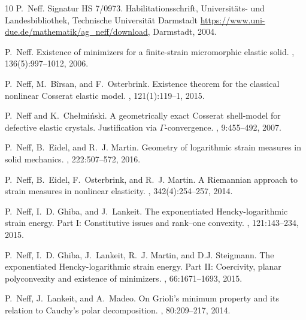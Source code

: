 \documentclass[11pt]{article}
\begin{document}
\begin{footnotesize}
\begin{thebibliography}{10}
P.~Neff.
\newblock Signatur HS 7/0973. Habilitationsschrift, Universit\"ats- und
  Landesbibliothek, Technische Universit\"at Darmstadt
  \url{https://www.uni-due.de/mathematik/ag_neff/download}, Darmstadt, 2004.

P.~Neff.
\newblock Existence of minimizers for a finite-strain micromorphic elastic
  solid.
, 136(5):997--1012, 2006.

P.~Neff, M.~B\^{i}rsan, and F.~Osterbrink.
\newblock Existence theorem for the classical nonlinear {C}osserat elastic
  model.
, 121(1):119--1, 2015.

P.~Neff and K.~Che{\l}mi\'nski.
\newblock A geometrically exact {C}osserat shell-model for defective elastic
  crystals. {J}ustification via {$\Gamma$}-convergence.
, 9:455--492, 2007.

P.~Neff, B.~Eidel, and R.~J. Martin.
\newblock Geometry of logarithmic strain measures in solid mechanics.
, 222:507--572,
  2016.

P.~Neff, B.~Eidel, F.~Osterbrink, and R.~J. Martin.
\newblock A {Riemannian} approach to strain measures in nonlinear elasticity.
, 342(4):254--257, 2014.

P.~Neff, I.~D. Ghiba, and J.~Lankeit.
\newblock The exponentiated {H}encky-logarithmic strain energy. {P}art {I}:
  {C}onstitutive issues and rank--one convexity.
, 121:143--234, 2015.

P.~Neff, I.~D. Ghiba, J.~Lankeit, R.~J. Martin, and D.J. Steigmann.
\newblock The exponentiated {H}encky-logarithmic strain energy. {P}art {II}:
  {C}oercivity, planar polyconvexity and existence of minimizers.
,
  66:1671--1693, 2015.

P.~Neff, J.~Lankeit, and A.~Madeo.
\newblock On {Grioli}'s minimum property and its relation to {Cauchy}'s polar
  decomposition.
, 80:209--217,
  2014.


\end{thebibliography}
\end{footnotesize}
\end{document}

